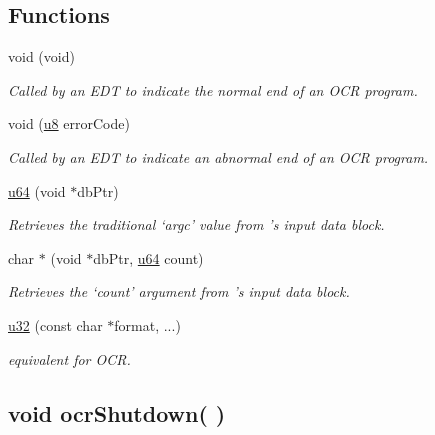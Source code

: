 \subsection*{Functions}
\begin{DoxyCompactItemize}
\item
  void \hyperlink{func_ocrShutdown}{}(void)
    \begin{DoxyCompactList}
      \small\item \emph{Called by an EDT to indicate the normal end of an OCR program.}
    \end{DoxyCompactList}
\item
  void \hyperlink{func_ocrAbort}{}(\hyperlink{type_u8}{u8} errorCode)
    \begin{DoxyCompactList}
      \small\item \emph{Called by an EDT to indicate an abnormal end of an OCR program.}
    \end{DoxyCompactList}
\item
  \hyperlink{type_u64}{u64} \hyperlink{func_getArgc}{}(void $\ast$dbPtr)
    \begin{DoxyCompactList}
      \small\item \emph{Retrieves the traditional `argc' value from
        \hyperlink{func_mainEdt}{}'s input data block.}
    \end{DoxyCompactList}
\item
  char $\ast$ \hyperlink{func_getArgv}{}(void $\ast$dbPtr,
  \hyperlink{type_u64}{u64} count)
    \begin{DoxyCompactList}
      \small\item \emph{Retrieves the `count' argument from
        \hyperlink{func_mainEdt}{}'s input data block.}
    \end{DoxyCompactList}
\item
  \hyperlink{type_u32}{u32} \hyperlink{func_PRINTF}{}(const char $\ast$format, ...)
    \begin{DoxyCompactList}
      \small\item \emph{ equivalent for OCR.}
    \end{DoxyCompactList}
\end{DoxyCompactItemize}
%
%
\hypertarget{func_ocrShutdown}{
  \subsection[{ocr\-Shutdown}]{\setlength{\rightskip}{0pt plus 5cm}void ocr\-Shutdown(
)}}
\label{func_ocrShutdown}

